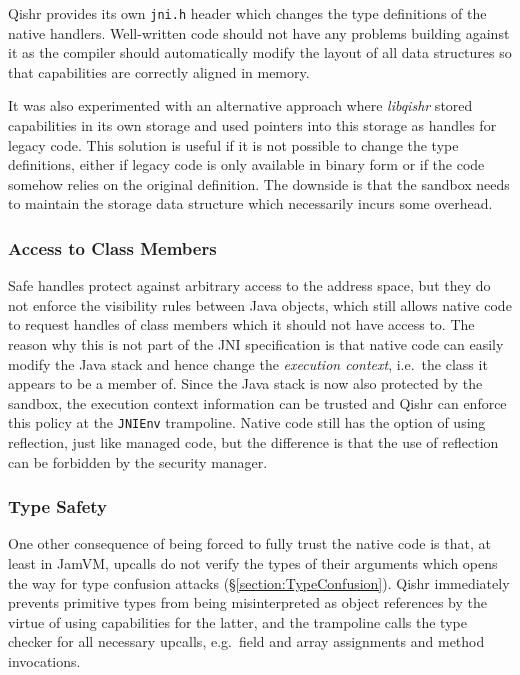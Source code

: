 \documentclass[a4paper,12pt,twoside,openright]{report}
\newcommand{\tool}[1]{\emph{#1}}
\newcommand{\lib}[1]{\tool{lib#1}}
\begin{document}
Qishr provides its own \texttt{jni.h} header which changes the type definitions of the native handlers. Well-written code should not have any problems building against it as the compiler should automatically modify the layout of all data structures so that capabilities are correctly aligned in memory.

It was also experimented with an alternative approach where \lib{qishr} stored capabilities in its own storage and used pointers into this storage as handles for legacy code. This solution is useful if it is not possible to change the type definitions, either if legacy code is only available in binary form or if the code somehow relies on the original definition. The downside is that the sandbox needs to maintain the storage data structure which necessarily incurs some overhead.

\subsubsection{Access to Class Members}

Safe handles protect against arbitrary access to the address space, but they do not enforce the visibility rules between Java objects, which still allows native code to request handles of class members which it should not have access to. The reason why this is not part of the JNI specification is that native code can easily modify the Java stack and hence change the \emph{execution context}, i.e.\ the class it appears to be a member of. Since the Java stack is now also protected by the sandbox, the execution context information can be trusted and Qishr can enforce this policy at the \texttt{JNIEnv} trampoline. Native code still has the option of using reflection, just like managed code, but the difference is that the use of reflection can be forbidden by the security manager.

\subsubsection{Type Safety}

One other consequence of being forced to fully trust the native code is that, at least in JamVM, upcalls do not verify the types of their arguments which opens the way for type confusion attacks (\S\ref{section:TypeConfusion}). Qishr immediately prevents primitive types from being misinterpreted as object references by the virtue of using capabilities for the latter, and the trampoline calls the type checker for all necessary upcalls, e.g.\ field and array assignments and method invocations.
\end{document}
